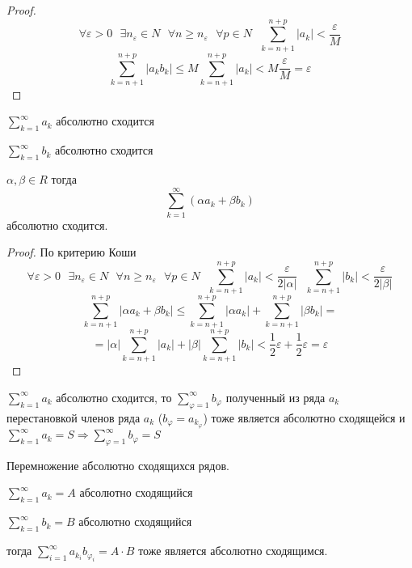 \begin{proof}
  $$
  \forall \varepsilon > 0 ~~~ \exists n_{\varepsilon} \in N ~~~
  \forall n \ge n_{\varepsilon} ~~~ \forall p \in N ~~~
  \sum_{k=n+1}^{n+p} |a_k| < \frac{\varepsilon}{M}
  $$
  $$
  \sum_{k=n+1}^{n+p} |a_k b_k| \le
  M \sum_{k=n+1}^{n+p} |a_k| < M \frac{\varepsilon}{M} = \varepsilon
  $$
\end{proof}

\begin{theorem}
  $\sum_{k=1}^{\infty} a_k$ абсолютно сходится

  $\sum_{k=1}^{\infty} b_k$ абсолютно сходится

  $\alpha, \beta \in R$ тогда
  $$
  \sum_{k=1}^{\infty} ( \alpha a_k + \beta b_k )
  $$
  абсолютно сходится.
\end{theorem}

\begin{proof}
  По критерию Коши
  $$
  \forall \varepsilon > 0 ~~~ \exists n_{\varepsilon} \in N ~~~
  \forall n \ge n_{\varepsilon} ~~~ \forall p \in N ~~~
  \sum_{k=n+1}^{n+p} |a_k| < \frac{\varepsilon}{2|\alpha|} ~~~
  \sum_{k=n+1}^{n+p} |b_k| < \frac{\varepsilon}{2|\beta|}
  $$
  $$
  \sum_{k=n+1}^{n+p} |\alpha a_k + \beta b_k| \le
  \sum_{k=n+1}^{n+p} |\alpha a_k| + \sum_{k=n+1}^{n+p} |\beta b_k| =
  $$
  $$
  = |\alpha| \sum_{k=n+1}^{n+p} |a_k| + |\beta| \sum_{k=n+1}^{n+p} |b_k| <
  \frac{1}{2} \varepsilon + \frac{1}{2} \varepsilon = \varepsilon
  $$
\end{proof}

\begin{theorem}
  $\sum_{k=1}^{\infty} a_k$ абсолютно сходится, то
  $\sum_{\varphi=1}^{\infty} b_{\varphi}$ полученный из ряда $a_k$ перестановкой членов
  ряда $a_k$ ($b_{\varphi} = a_{k_{\varphi}}$) тоже является абсолютно сходящейся и
  $\sum_{k=1}^{\infty} a_k = S \Rightarrow
  \sum_{\varphi=1}^{\infty} b_{\varphi} = S$
\end{theorem}

\begin{title}
  Перемножение абсолютно сходящихся рядов.
\end{title}

\begin{theorem}
  $\sum_{k=1}^{\infty} a_k = A$ абсолютно сходящийся

  $\sum_{k=1}^{\infty} b_k = B$ абсолютно сходящийся

  тогда $\sum_{i=1}^{\infty} a_{k_i} b_{\varphi_i} = A \cdot B$ тоже является
  абсолютно сходящимся.
\end{theorem}

